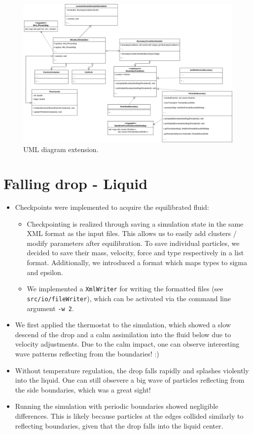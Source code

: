 \documentclass{article}
\begin{document}
\begin{figure}[H]
    \includegraphics[width=1.25\textwidth]{../../res/UML4v2.drawio}
    \caption{UML diagram extension.}
    \label{fig:uml}
\end{figure}

\section{Falling drop - Liquid}
\label{sec:drop}

    \begin{itemize}
        \item Checkpoints were implemented to acquire the equilibrated fluid:
        \begin{itemize}
            \item Checkpointing is realized through saving a simulation state in the same XML format as the input files. This allows us to easily add clusters / modify parameters after equilibration. To save individual particles, we decided to save their mass, velocity, force and type respectively in a list format. Additionally, we introduced a format which maps types to sigma and epsilon.
            \item We implemented a \texttt{XmlWriter} for writing the formatted files (see \texttt{src/io/fileWriter}), which can be activated via the command line argument \texttt{-w 2}.
        \end{itemize}
    \item We first applied the thermostat to the simulation, which showed a slow descend of the drop and a calm assimilation into the fluid below due to velocity adjustments. Due to the calm impact, one can observe interesting wave patterns reflecting from the boundaries! :)
        \item Without temperature regulation, the drop falls rapidly and splashes violently into the liquid. One can still obsevere a big wave of particles reflecting from the side boundaries, which was a great sight!
        \item Running the simulation with periodic boundaries showed negligible differences. This is likely because particles at the edges collided similarly to reflecting boundaries, given that the drop falls into the liquid center.    \end{itemize}
\end{document}
